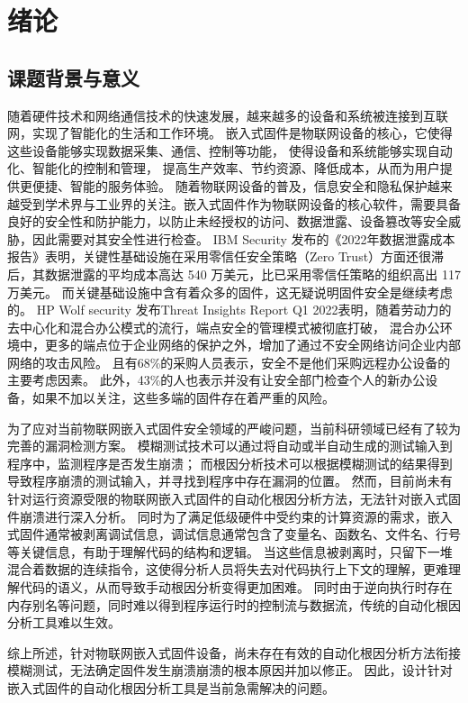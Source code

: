 \cleardoublepage

\section{绪论}
\subsection{课题背景与意义}
随着硬件技术和网络通信技术的快速发展，越来越多的设备和系统被连接到互联网，实现了智能化的生活和工作环境。
嵌入式固件是物联网设备的核心，它使得这些设备能够实现数据采集、通信、控制等功能，
使得设备和系统能够实现自动化、智能化的控制和管理，
提高生产效率、节约资源、降低成本，从而为用户提供更便捷、智能的服务体验。
随着物联网设备的普及，信息安全和隐私保护越来越受到学术界与工业界的关注。嵌入式固件作为物联网设备的核心软件，需要具备良好的安全性和防护能力，以防止未经授权的访问、数据泄露、设备篡改等安全威胁，因此需要对其安全性进行检查。
IBM Security 发布的《2022年数据泄露成本报告》\cite{Cost}表明，关键性基础设施在采用零信任安全策略（Zero Trust）方面还很滞后，其数据泄露的平均成本高达 540 万美元，比已采用零信任策略的组织高出 117 万美元。
而关键基础设施中含有着众多的固件，这无疑说明固件安全是继续考虑的。
HP Wolf security 发布Threat Insights Report Q1 2022\cite{HP-Wolf}表明，随着劳动力的去中心化和混合办公模式的流行，端点安全的管理模式被彻底打破，
混合办公环境中，更多的端点位于企业网络的保护之外，增加了通过不安全网络访问企业内部网络的攻击风险。
且有68\%的采购人员表示，安全不是他们采购远程办公设备的主要考虑因素。
此外，43\%的人也表示并没有让安全部门检查个人的新办公设备，如果不加以关注，这些多端的固件存在着严重的风险。

为了应对当前物联网嵌入式固件安全领域的严峻问题，当前科研领域已经有了较为完善的漏洞检测方案。
模糊测试技术可以通过将自动或半自动生成的测试输入到程序中，监测程序是否发生崩溃；
而根因分析技术可以根据模糊测试的结果得到导致程序崩溃的测试输入，并寻找到程序中存在漏洞的位置。
然而，目前尚未有针对运行资源受限的物联网嵌入式固件的自动化根因分析方法，无法针对嵌入式固件崩溃进行深入分析。
同时为了满足低级硬件中受约束的计算资源的需求，嵌入式固件通常被剥离调试信息，调试信息通常包含了变量名、函数名、文件名、行号等关键信息，有助于理解代码的结构和逻辑。
当这些信息被剥离时，只留下一堆混合着数据的连续指令，这使得分析人员将失去对代码执行上下文的理解，更难理解代码的语义，从而导致手动根因分析变得更加困难。
同时由于逆向执行时存在内存别名等问题，同时难以得到程序运行时的控制流与数据流，传统的自动化根因分析工具难以生效。

综上所述，针对物联网嵌入式固件设备，尚未存在有效的自动化根因分析方法衔接模糊测试，无法确定固件发生崩溃崩溃的根本原因并加以修正。
因此，设计针对嵌入式固件的自动化根因分析工具是当前急需解决的问题。

